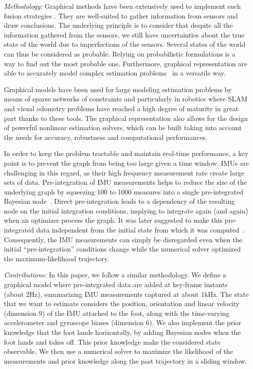 \textit{Methodology: }
Graphical methods have been extensively used to implement such fusion strategies \cite{Thrun:ijrr:2006,Kaess:itro:2008}.
They are well-suited to gather information from sensors
and draw conclusions. The underlying principle is to consider that despite all the information gathered from the sensors, we still have uncertainties about the true state of the world due to imperfections of the sensors.
Several states of the world can thus be considered as probable.
Relying on probabilistic formulations is a way to find out the most probable one. Furthermore, graphical representation are able to accurately model 
complex estimation problems~\cite{koller2009probabilistic} in a versatile way. 

Graphical models have been used for large modeling estimation problems by means of sparse networks of constraints and particularly in
robotics where SLAM and visual odometry problems have reached a high degree of maturity in great part thanks to these tools.
The graphical representation also allows for the design of powerful nonlinear estimation solvers, which can be built taking into account the needs for accuracy, 
robustness and computational performances.

In order to keep the problem tractable and maintain real-time performance, a key point is to prevent the graph from being too large given a time window.
IMUs are challenging in this regard, as their high frequency measurement rate create large sets of data. 
Pre-integration of IMU measurements helps to reduce the size of the underlying graph by squeezing 100 to 1000 measures into a single pre-integrated Bayesian node~\cite{LUPTON-09}.
Direct pre-integration leads to a dependency of the resulting node on the initial integration conditions, implying to integrate again (and again) when an optimizer process the graph.
It was later suggested to make this pre-integrated data independent from the initial state from which it was computed~\cite{forster2015imu}.
Consequently, the IMU measurements can simply be disregarded even when the initial ``pre-integration'' conditions change while the numerical solver optimized the maximum-likelihood trajectory.

\textit{Contributions: }
In this paper, we follow a similar methodology. We define a graphical model where pre-integrated data are added at key-frame instants (about 2Hz), summarizing IMU measurements captured at about 1kHz.
The state that we want to estimate considers the position, orientation and linear velocity (dimension 9) of the IMU attached to the foot, along with the time-varying accelerometer and gyroscope biases (dimension 6).
We also implement the prior knowledge that the foot lands horizontally, by adding Bayesian nodes when the foot lands and takes off.
This prior knowledge make the considered state observable. 
We then use a numerical solver to maximize the likelihood of the measurements and prior knowledge along the past trajectory in a sliding window. 

